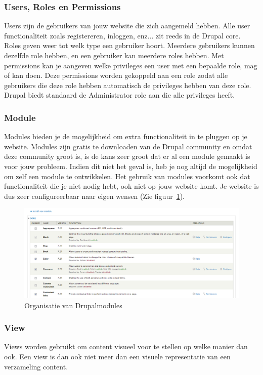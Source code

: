 \subsubsection{Users, Roles en Permissions}
Users zijn de gebruikers van jouw website die zich aangemeld hebben. Alle user functionaliteit zoals registereren, inloggen, enz... zit reeds in de Drupal core. Roles geven weer tot welk type een gebruiker hoort. Meerdere gebruikers kunnen dezelfde role hebben, en een gebruiker kan meerdere roles hebben. Met permissions kan je aangeven welke privileges een user met een bepaalde role, mag of kan doen. Deze permissions worden gekoppeld aan een role zodat alle gebruikers die deze role hebben automatisch de privileges hebben van deze role. Drupal biedt standaard de Administrator role aan die alle privileges heeft.

\newpage

\subsubsection{Module}
Modules bieden je de mogelijkheid om extra functionaliteit in te pluggen op je website. Modules zijn gratis te downloaden van de Drupal community en omdat deze community groot is, is de kans zeer groot dat er al een module gemaakt is voor jouw probleem. Indien dit niet het geval is, heb je nog altijd de mogelijkheid om zelf een module te ontwikkelen. Het gebruik van modules voorkomt ook dat functionaliteit die je niet nodig hebt, ook niet op jouw website komt. Je website is dus zeer configureerbaar naar eigen wensen (Zie figuur~\ref{fig:drupalOrganizeModules}).
\begin{figure}[h]
\includegraphics[width=1\textwidth]{fig/drupalOrganizeModules}
\caption{Organisatie van Drupalmodules}
\label{fig:drupalOrganizeModules}
\end{figure}

\subsubsection{View}
Views worden gebruikt om content visueel voor te stellen op welke manier dan ook. Een view is dan ook niet meer dan een visuele representatie van een verzameling content.

